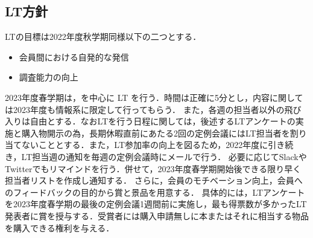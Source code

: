 \subsection*{LT方針}


LTの目標は2022年度秋学期同様以下の二つとする．
\begin{itemize}
    \item 会員間における自発的な発信
    \item 調査能力の向上
\end{itemize}
2023年度春学期は\secondGrade{}，\thirdGrade{}を中心に LT を行う．時間は正確に5分とし，内容に関しては2023年度も情報系に限定して行ってもらう．
また，各週の担当者以外の飛び入りは自由とする．なおLTを行う日程に関しては，後述するLTアンケートの実施と購入物開示の為，長期休暇直前にあたる2回の定例会議にはLT担当者を割り当てないこととする．また，LT参加率の向上を図るため，2022年度に引き続き，LT担当週の通知を毎週の定例会議時にメールで行う．
必要に応じてSlackやTwitterでもリマインドを行う．併せて，2023年度春学期開始後できる限り早く担当者リストを作成し通知する．
さらに，会員のモチベーション向上，会員へのフィードバックの目的から賞と景品を用意する．
具体的には，LTアンケートを2023年度春学期の最後の定例会議1週間前に実施し，最も得票数が多かったLT発表者に賞を授与する．受賞者には購入申請無しに本またはそれに相当する物品を購入できる権利を与える．
